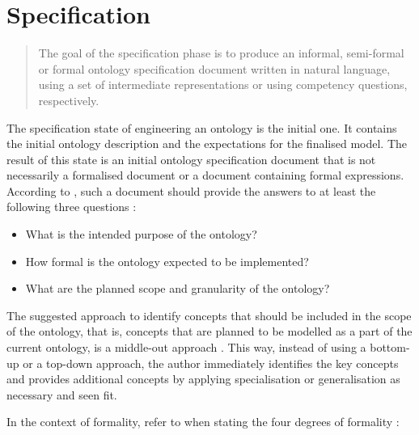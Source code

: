 \chapter{Specification}\label{ch:Specification}


\blockquote[{{\cite[p. 2]{fernandez-lopez1997METHONTOLOGYOntologicalArt}}}]{The goal of the specification phase is to produce an informal, semi-formal or formal ontology specification document written in natural language, using a set of intermediate representations or using competency questions, respectively.}

The specification state of engineering an ontology is the initial one. It contains the initial ontology description and the expectations for the finalised model. The result of this state is an initial ontology specification document that is not necessarily a formalised document or a document containing formal expressions. According to \citeauthor{fernandez-lopez1997METHONTOLOGYOntologicalArt}, such a document should provide the answers to at least the following three questions
\cite{fernandez-lopez1997METHONTOLOGYOntologicalArt}%
:

\begin{itemize}
    \item What is the intended purpose of the ontology?
    \item How formal is the ontology expected to be implemented?
    \item What are the planned scope and granularity of the ontology?
\end{itemize}

The suggested approach to identify concepts that should be included in the scope of the ontology, that is, concepts that are planned to be modelled as a part of the current ontology, is a middle-out approach \cite{fernandez-lopez1997METHONTOLOGYOntologicalArt,uschold1996OntologiesPrinciplesMethods}. This way, instead of using a bottom-up or a top-down approach, the author immediately identifies the key concepts and provides additional concepts by applying specialisation or generalisation as necessary and seen fit.

In the context of formality, \citeauthor{fernandez-lopez1997METHONTOLOGYOntologicalArt} refer to \citeauthor{uschold1996OntologiesPrinciplesMethods} when stating the four degrees of formality \cite{uschold1996OntologiesPrinciplesMethods}:

